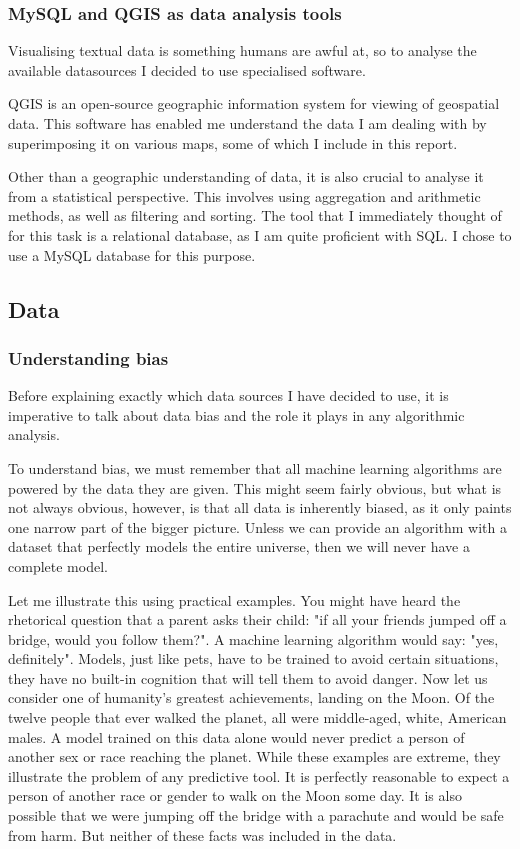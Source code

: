 \documentclass{article}
\begin{document}
	\subsubsection{MySQL and QGIS as data analysis tools}

	Visualising textual data is something humans are awful at, so to analyse the available datasources I decided to use specialised software.

	QGIS is an open-source geographic information system for viewing of geospatial data. This software has enabled me understand the data I am dealing with by superimposing it on various maps, some of which I include in this report.

	Other than a geographic understanding of data, it is also crucial to analyse it from a statistical perspective. This involves using aggregation and arithmetic methods, as well as filtering and sorting. The tool that I immediately thought of for this task is a relational database, as I am quite proficient with SQL. I chose to use a MySQL database for this purpose.

	\subsection{Data}

	\subsubsection{Understanding bias}

	Before explaining exactly which data sources I have decided to use, it is imperative to talk about data bias and the role it plays in any algorithmic analysis.

	To understand bias, we must remember that all machine learning algorithms are powered by the data they are given. This might seem fairly obvious, but what is not always obvious, however, is that all data is inherently biased, as it only paints one narrow part of the bigger picture. Unless we can provide an algorithm with a dataset that perfectly models the entire universe, then we will never have a complete model.

	Let me illustrate this using practical examples. You might have heard the rhetorical question that a parent asks their child: "if all your friends jumped off a bridge, would you follow them?". A machine learning algorithm would say: "yes, definitely". Models, just like pets, have to be trained to avoid certain situations, they have no built-in cognition that will tell them to avoid danger. Now let us consider one of humanity's greatest achievements, landing on the Moon. Of the twelve people that ever walked the planet, all were middle-aged, white, American males. A model trained on this data alone would never predict a person of another sex or race reaching the planet. While these examples are extreme, they illustrate the problem of any predictive tool. It is perfectly reasonable to expect a person of another race or gender to walk on the Moon some day. It is also possible that we were jumping off the bridge with a parachute and would be safe from harm. But neither of these facts was included in the data.
\end{document}
